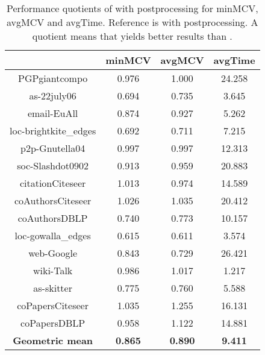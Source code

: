 \documentclass[pdftex]{llncs}
\numberwithin{equation}{section}
\numberwithin{example}{section}
\numberwithin{table}{section}
\begin{document}
\begin{table}[tb]
  \caption{Performance quotients of  with postprocessing for minMCV, avgMCV
    and avgTime. Reference is  with postprocessing. A quotient  means that
     yields better results than .}
\begin{center}
\begin{tabular}{ c | c  c | c }
& minMCV  & avgMCV & avgTime\\
                        \hline \hline
PGPgiantcompo           &  0.976              &   1.000              &  24.258               \\ \hline
as-22july06             &  0.694              &   0.735              &   3.645               \\ \hline
email-EuAll             &  0.874              &   0.927              &   5.262               \\ \hline
loc-brightkite\_edges   &  0.692              &   0.711              &   7.215               \\ \hline
p2p-Gnutella04          &  0.997              &   0.997              &  12.313               \\ \hline
soc-Slashdot0902        &  0.913              &   0.959              &  20.883               \\ \hline
citationCiteseer        &  1.013              &   0.974              &  14.589               \\ \hline
coAuthorsCiteseer       &  1.026              &   1.035              &  20.412               \\ \hline 
coAuthorsDBLP           &  0.740              &   0.773              &  10.157               \\ \hline
loc-gowalla\_edges      &  0.615              &   0.611              &   3.574               \\ \hline
web-Google              &  0.843              &   0.729              &  26.421               \\ \hline
wiki-Talk               &  0.986              &   1.017              &   1.217               \\ \hline
as-skitter              &  0.775              &   0.760              &   5.588               \\ \hline
coPapersCiteseer        &  1.035              &   1.255              &  16.131               \\ \hline
coPapersDBLP            &  0.958              &   1.122              &  14.881               \\ \hline  \hline
\textbf{Geometric mean} &  \textbf{0.865}     &  \textbf{0.890}      &\textbf{9.411}        \\ \hline
\end{tabular}
\end{center}
\label{tab:MCV_200}
\end{table}
\end{document}
